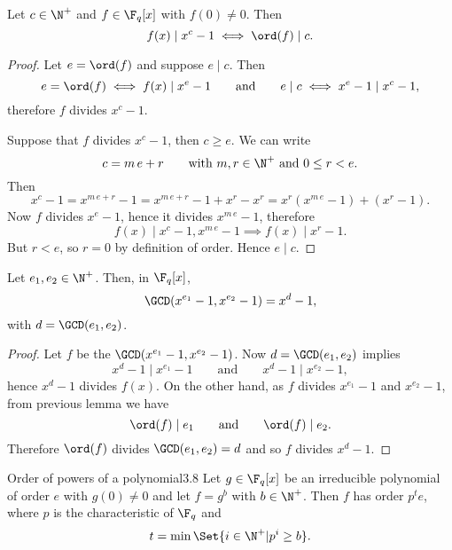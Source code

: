 \begin{lem}\label{3.6}
	Let \(c \in \N^+\) and \(f \in \F_q[x]\) with \(f(0)\neq 0\). Then
	\[
		f(x) \mid x^c-1 \iff \ord(f) \mid c.
	\]
\end{lem}

\begin{proof}
	Let \(e=\ord(f)\) and suppose \(e \mid c\). Then 
	\[
		e = \ord(f) \iff f(x) \mid x^e-1 \qquad\text{and}\qquad e \mid c \iff x^e-1 \mid x^c-1,
	\]
	therefore \(f\) divides \(x^c-1\).
	
	Suppose that \(f\) divides \(x^c-1\), then \(c \ge e\). We can write
	\[
		c = m\,e + r \qquad\text{with }m,r\in \N^+ \text{ and }0\le r <e.
	\]
	Then
	\[
		x^c-1 = x^{m\,e+r}-1 = x^{m\,e+r}-1+x^r-x^r = x^r (x^{m\,e}-1) + (x^r-1).
	\]
	Now \(f\) divides \(x^e-1\), hence it divides \(x^{m\,e}-1\), therefore
	\[
		f(x)\mid x^c-1, x^{m\,e}-1 \implies f(x) \mid x^r-1.
	\]
	But \(r<e\), so \(r=0\) by definition of order. Hence \(e \mid c\).
\end{proof}

\begin{cor}
	Let \(e_1,e_2 \in \N^+\). Then, in \(\F_q[x]\),
	\[
		\GCD(x^{e_1}-1,x^{e_2}-1) = x^d-1,
	\]
	with \(d = \GCD(e_1,e_2)\).
\end{cor}

\begin{proof}
	Let \(f\) be the \(\GCD(x^{e_1}-1,x^{e_2}-1)\). Now \(d=\GCD(e_1,e_2)\) implies
	\[
		x^d-1 \mid x^{e_1}-1\qquad\text{and}\qquad x^d-1 \mid x^{e_2}-1,
	\]
	hence \(x^d-1\) divides \(f(x)\). On the other hand, as \(f\) divides \(x^{e_1}-1\) and \(x^{e_2}-1\), from previous lemma we have
	\[
		\ord(f) \mid e_1 \qquad\text{and}\qquad \ord(f) \mid e_2.
	\]
	Therefore \(\ord(f)\) divides \(\GCD(e_1,e_2)=d\) and so \(f\) divides \(x^d-1\).
\end{proof}

\begin{teor}{Order of powers of a polynomial}{3.8}
	Let \(g\in\F_q[x]\) be an irreducible polynomial of order \(e\) with \(g(0)\neq 0\) and let \(f = g^b\) with \(b\in \N^+\). Then \(f\) has order \(p^t e\), where \(p\) is the characteristic of \(\F_q\) and
	\[
		t = \min\Set{i \in \N^+ | p^i \ge b}.
	\]
\end{teor}

